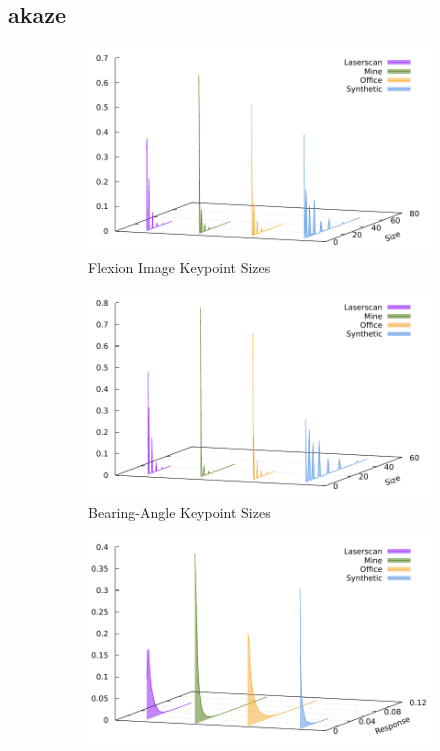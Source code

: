 \subsection{\acrshort{akaze}}\label{sec:akaze_stats}
\begin{figure}[H]
\begin{subfigure}[t]{0.45\linewidth}
    \includegraphics[width=\linewidth]{chapter06/results/AKAZE/flexion/size.pdf}%
    \caption{Flexion Image Keypoint Sizes}
\end{subfigure}\quad
\begin{subfigure}[t]{0.45\linewidth}
    \includegraphics[width=\linewidth]{chapter06/results/AKAZE/bearing/size.pdf}
    \caption{Bearing-Angle Keypoint Sizes}
\end{subfigure}
\begin{subfigure}[t]{0.45\linewidth}
    \includegraphics[width=\linewidth]{chapter06/results/AKAZE/flexion/response.pdf}%

\end{subfigure}
\end{figure}
